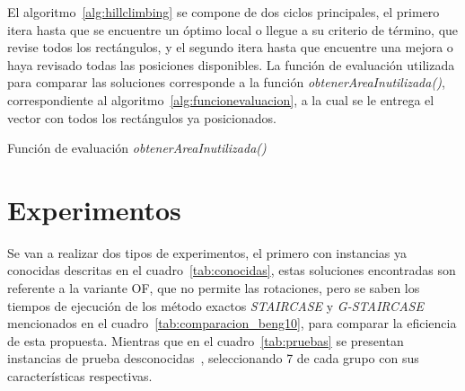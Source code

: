 \documentclass[letter, 10pt]{article}
\begin{document}
El algoritmo~\ref{alg:hillclimbing} se compone de dos ciclos principales, el primero itera hasta que se encuentre un \'optimo local o llegue a su criterio de t\'ermino, que revise todos los rect\'angulos, y el segundo itera hasta que encuentre una mejora o haya revisado todas las posiciones disponibles. La funci\'on de evaluaci\'on utilizada para comparar las soluciones corresponde a la funci\'on \emph{obtenerAreaInutilizada()}, correspondiente al algoritmo~\ref{alg:funcionevaluacion}, a la cual se le entrega el vector con todos los rect\'angulos ya posicionados.
\vspace{0.2cm}

\begin{algorithm}[H]
\caption{Funci\'on de evaluaci\'on \emph{obtenerAreaInutilizada()}}
\label{alg:funcionevaluacion}

\SetNoFillComment 



\end{algorithm}

\section{Experimentos}

Se van a realizar dos tipos de experimentos, el primero con instancias ya conocidas descritas en el cuadro~\ref{tab:conocidas}, estas soluciones encontradas son referente a la variante OF, que no permite las rotaciones, pero se saben los tiempos de ejecuci\'on de los m\'etodo exactos \emph{STAIRCASE} y \emph{G-STAIRCASE} mencionados en el cuadro~\ref{tab:comparacion_beng10}, para comparar la eficiencia de esta propuesta. Mientras que en el cuadro~\ref{tab:pruebas} se presentan instancias de prueba desconocidas~\cite{carpetaInstancias2023}, seleccionando 7 de cada grupo con sus caracter\'isticas respectivas.
\end{document}
